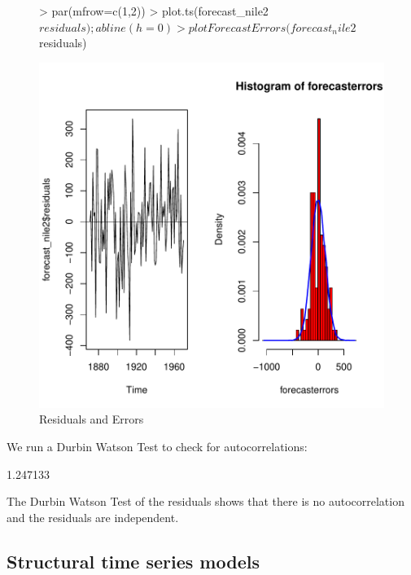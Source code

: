 \documentclass[10pt, a4paper]{article} %
\begin{document}
\begin{figure}[H]
\centering
\begin{Schunk}
\begin{Sinput}
> par(mfrow=c(1,2))
> plot.ts(forecast_nile2$residuals); abline(h=0)
> plotForecastErrors(forecast_nile2$residuals)
\end{Sinput}
\end{Schunk}
\includegraphics{FINAL_VERSION-099}
\caption{Residuals and Errors}
\end{figure}


\noindent We run a Durbin Watson Test to check for autocorrelations:
\begin{Schunk}
\begin{Soutput}
[1] 1.247133
\end{Soutput}
\end{Schunk}
\noindent The Durbin Watson Test of the residuals shows that there is no autocorrelation and the residuals are independent.


\subsection{Structural time series models}
\end{document}

